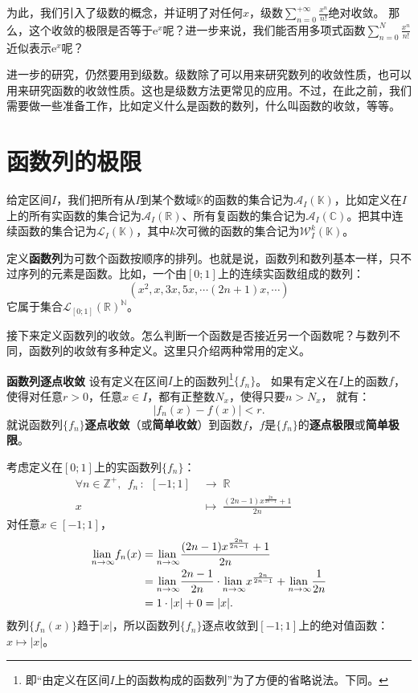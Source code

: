 \documentclass[12pt,UTF8]{ctexbook}
\begin{document}
为此，我们引入了级数的概念，并证明了对任何$x$，级数$\sum_{n=0}^{+\infty}\frac{x^{n}}{n!}$绝对收敛。
那么，这个收敛的极限是否等于$\mathrm{e}^x$呢？进一步来说，我们能否用多项式函数$\sum_{n=0}^N\frac{x^{n}}{n!}$
近似表示$\mathrm{e}^x$呢？

进一步的研究，仍然要用到级数。级数除了可以用来研究数列的收敛性质，也可以用来研究函数的收敛性质。这也是级数方法更常见的应用。不过，在此之前，我们需要做一些准备工作，比如定义什么是函数的数列，什么叫函数的收敛，等等。

\section{函数列的极限}

给定区间$I$，我们把所有从$I$到某个数域$\mathbb{K}$的函数的集合记为$\mathcal{A}_I(\mathbb{K})$，比如定义在$I$上的所有实函数的集合记为$\mathcal{A}_I(\mathbb{R})$、所有复函数的集合记为$\mathcal{A}_I(\mathbb{C})$。把其中连续函数的集合记为$\mathcal{L}_I(\mathbb{K})$，其中$k$次可微的函数的集合记为$\mathcal{W}_I^k(\mathbb{K})$。

定义\textbf{函数列}为可数个函数按顺序的排列。也就是说，函数列和数列基本一样，只不过序列的元素是函数。比如，一个由$[0;1]$上的连续实函数组成的数列：
$$ (x^2, x, 3x, 5x, \cdots (2n+1)x, \cdots )$$
它属于集合$\mathcal{L}_{[0;1]}(\mathbb{R})^{\mathbb{N}}$。

接下来定义函数列的收敛。怎么判断一个函数是否接近另一个函数呢？与数列不同，函数列的收敛有多种定义。这里只介绍两种常用的定义。
\begin{df}{\textbf{函数列逐点收敛}}
    设有定义在区间$I$上的函数列\footnote{即“由定义在区间$I$上的函数构成的函数列”为了方便的省略说法。下同。}$\{f_n\}$。
    如果有定义在$I$上的函数$f$，使得对任意$r>0$，任意$x\in I$，都有正整数$N_x$，使得只要$n>N_x$，
    就有：
    $$ |f_n(x) - f(x) | < r.$$
    就说函数列$\{f_n\}$\textbf{逐点收敛}（或\textbf{简单收敛}）到函数$f$，$f$是$\{f_n\}$的\textbf{逐点极限}或\textbf{简单极限}。
\end{df}

\begin{ex}
    考虑定义在$[0;1]$上的实函数列$\{f_n\}$：
    \begin{align*}
        \forall n\in \mathbb{Z}^+, \;\, f_n \,: \,\; [-1;1]\; &\rightarrow \; \mathbb{R} \\
        x \;&\mapsto \; \frac{(2n-1)x^{\frac{2n}{2n-1}} + 1}{2n} \qquad\qquad\phantom{9} 
    \end{align*}
    对任意$x\in [-1;1]$，
    \begin{align*}
        \underset{n\to\infty}{\operatorname{lian}\,}f_n(x) &= \underset{n\to\infty}{\operatorname{lian}\,} \frac{(2n-1)x^{\frac{2n}{2n-1}} + 1}{2n} \\
        &= \underset{n\to\infty}{\operatorname{lian}\,} \frac{2n-1}{2n} \cdot\underset{n\to\infty}{\operatorname{lian}\,} x^{\frac{2n}{2n-1}} + \underset{n\to\infty}{\operatorname{lian}\,} \frac{1}{2n} \\
        &= 1 \cdot |x| + 0 = |x|. 
    \end{align*}
    数列$\{f_n(x)\}$趋于$|x|$，所以函数列$\{f_n\}$逐点收敛到$[-1;1]$上的绝对值函数：$x\mapsto |x|$。
\end{ex}
\end{document}

